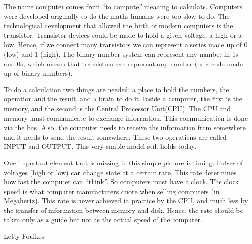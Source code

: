 \documentclass[logo]{impletter}
\begin{document}
The name computer comes from ``to compute'' meaning to
calculate. Computers were developed originally to do the maths humans
were too slow to do. The technological development that allowed the
birth of modern computers is the transistor. Transistor devices could
be made to hold a given voltage, a high or a low. Hence, if we connect
many transistors we can represent a series made up of 0 (low) and 1
(high). The binary number system can represent any number in 1s and
0s, which means that transistors can represent any number (or a code
made up of binary numbers).

To do a calculation two things are needed: a place to hold the
numbers, the operation and the result, and a brain to do it. Inside a
computer, the first is the memory, and the second is the Central
Processor Unit(CPU). The CPU and memory must communicate to exchange
information. This communication is done via the bus. Also, the
computer needs to receive the information from somewhere and it needs
to send the result somewhere. These two operations are called INPUT
and OUTPUT. This very simple model still holds today.

One important element that is missing in this simple picture is
timing. Pulses of voltages (high or low) can change state at a certain
rate. This rate determines how fast the computer can ``think''. So
computers must have a clock. The clock speed is what computer
manufacturers quote when selling computers (in Megahertz). This rate
is never achieved in practice by the CPU, and much less by the
transfer of information between memory and disk. Hence, the rate
should be taken only as a guide but not as the actual speed of the
computer.

{
Letty Foulkes
}
\end{document}
